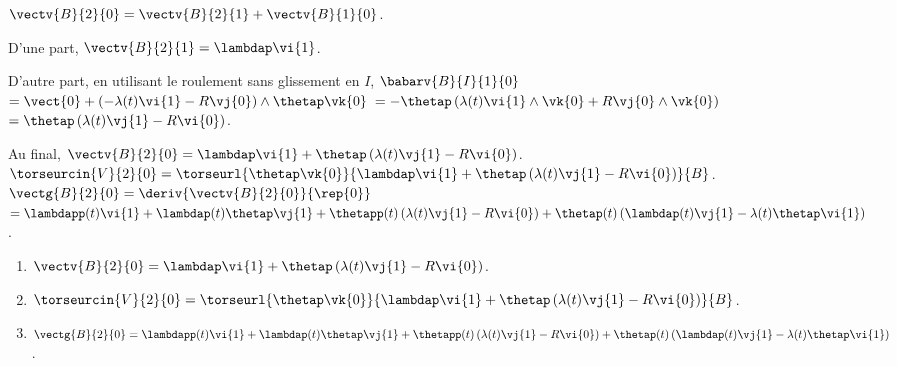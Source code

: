\begin{corrigebox}
$\vectv{B}{2}{0}=\vectv{B}{2}{1}+\vectv{B}{1}{0}$.

D'une part,  $\vectv{B}{2}{1}=\lambdap\vi{1}$.

D'autre part, en utilisant le roulement sans glissement en $I$, 
$\babarv{B}{I}{1}{0} $ $=\vect{0}+\left(-\lambda(t)\vi{1}-R\vj{0} \right)\wedge\thetap \vk{0}$
$=-\thetap\left(\lambda(t)\vi{1}\wedge \vk{0}+R\vj{0}\wedge \vk{0} \right)$
$=\thetap\left(\lambda(t)\vj{1}-R\vi{0} \right)$.

Au final, $\vectv{B}{2}{0} = \lambdap\vi{1} + \thetap\left(\lambda(t)\vj{1}-R\vi{0} \right)$.
$\torseurcin{V}{2}{0}=\torseurl{\thetap \vk{0}}{ \lambdap\vi{1} + \thetap\left(\lambda(t)\vj{1}-R\vi{0} \right)}{B}$.
$\vectg{B}{2}{0} = \deriv{\vectv{B}{2}{0}}{\rep{0}}$
$ = \lambdapp(t)\vi{1} +\lambdap(t)\thetap\vj{1} 
+ \thetapp(t)\left(\lambda(t)\vj{1}-R\vi{0} \right)
+ \thetap(t)\left(\lambdap(t)\vj{1}-\lambda(t)\thetap\vi{1} \right)
$.

\begin{enumerate}
\item $\vectv{B}{2}{0} = \lambdap\vi{1} + \thetap\left(\lambda(t)\vj{1}-R\vi{0} \right)$.
\item $\torseurcin{V}{2}{0}=\torseurl{\thetap \vk{0}}{ \lambdap\vi{1} + \thetap\left(\lambda(t)\vj{1}-R\vi{0} \right)}{B}$.
\item $\vectg{B}{2}{0}  = \lambdapp(t)\vi{1} +\lambdap(t)\thetap\vj{1} 
+ \thetapp(t)\left(\lambda(t)\vj{1}-R\vi{0} \right)
+ \thetap(t)\left(\lambdap(t)\vj{1}-\lambda(t)\thetap\vi{1} \right)
$.
\end{enumerate}
\end{corrigebox}
